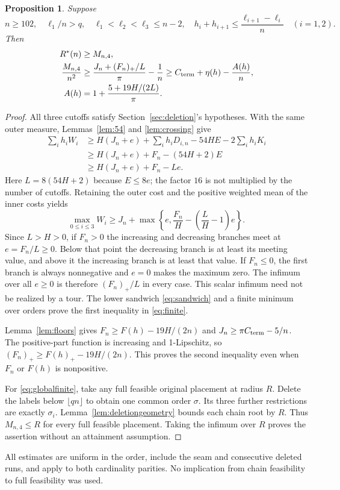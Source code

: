 \documentclass[11pt,a4paper]{article}
\newtheorem{proposition}[theorem]{Proposition}
\theoremstyle{remark}\newtheorem{remark}[theorem]{Remark}
\newcommand{\Rstar}{R^*}
\newcommand{\Cterm}{C_{\rm term}}
\begin{document}
\begin{proposition}\label{prop:finite}
Suppose
\begin{equation}\label{eq:finitegates}
n\ge102,\quad \ell_1/n>q,\quad
\ell_1<\ell_2<\ell_3\le n-2,\quad
h_i+h_{i+1}\le\frac{\ell_{i+1}-\ell_i}{n}\quad(i=1,2).
\end{equation}
Then
\begin{align}
\Rstar(n)&\ge M_{n,4},\label{eq:globalfinite}\\
\frac{M_{n,4}}{n^2}&\ge\frac{J_n+(F_n)_+/L}{\pi}-\frac1n
\ge\Cterm+\eta(h)-\frac{A(h)}n,\label{eq:finite}\\
A(h)&=1+\frac{5+19H/(2L)}\pi.\nonumber
\end{align}
\end{proposition}
\begin{proof}
All three cutoffs satisfy Section~\ref{sec:deletion}'s hypotheses. With
the same outer measure, Lemmas~\ref{lem:54} and \ref{lem:crossing} give
\begin{align*}
\sum_i h_iW_i
&\ge H(J_n+e)+\sum_i h_iD_{i,n}-54HE-2\sum_i h_iK_i\\
&\ge H(J_n+e)+F_n-(54H+2)E\\
&\ge H(J_n+e)+F_n-Le.
\end{align*}
Here $L=8(54H+2)$ because $E\le8e$; the factor $16$ is not
multiplied by the number of cutoffs. Retaining the outer cost and the
positive weighted mean of the inner costs yields
\[
\max_{0\le i\le3}W_i\ge J_n+
\max\left\{e,\frac{F_n}{H}-\left(\frac LH-1\right)e\right\}.
\]
Since $L>H>0$, if $F_n>0$ the increasing and decreasing branches meet
at $e=F_n/L\ge0$. Below that point the decreasing branch is at least
its meeting value, and above it the increasing branch is at least that
value. If $F_n\le0$, the first branch is always nonnegative and $e=0$
makes the maximum zero. The infimum over all $e\ge0$ is therefore
$(F_n)_+/L$ in every case. This scalar infimum need not be realized by
a tour. The lower sandwich \eqref{eq:sandwich} and a finite minimum
over orders prove the first inequality in \eqref{eq:finite}.

Lemma~\ref{lem:floors} gives $F_n\ge F(h)-19H/(2n)$ and
$J_n\ge\pi\Cterm-5/n$. The positive-part function is increasing and
1-Lipschitz, so $(F_n)_+\ge F(h)_+-19H/(2n)$. This proves the second
inequality even when $F_n$ or $F(h)$ is nonpositive.

For \eqref{eq:globalfinite}, take any full feasible original placement
at radius $R$. Delete the labels below $\lfloor qn\rfloor$ to obtain
one common order $\sigma$. Its three further restrictions are exactly
$\sigma_i$. Lemma~\ref{lem:deletiongeometry} bounds each chain root by
$R$. Thus $M_{n,4}\le R$ for every full feasible placement. Taking the
infimum over $R$ proves the assertion without an attainment assumption.
\end{proof}
All estimates are uniform in the order, include the seam and consecutive
deleted runs, and apply to both cardinality parities. No implication from
chain feasibility to full feasibility was used.
\end{document}
